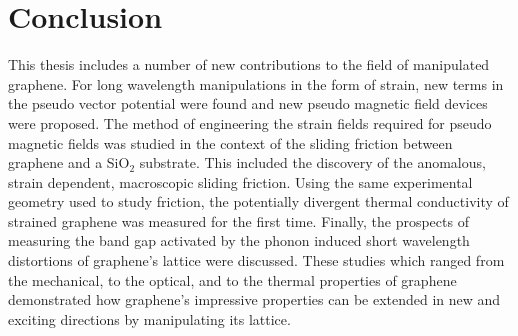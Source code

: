 \chapter{Conclusion}
This thesis includes a number of new contributions to the field of manipulated grap\-hene.
For long wavelength manipulations in the form of strain, new terms in the pseudo vector potential were found and new pseudo magnetic field devices were proposed.
The method of engineering the strain fields required for pseudo magnetic fields was studied in the context of the sliding friction between graphene and a SiO$_2$ substrate.
This included the discovery of the anomalous, strain dependent, macroscopic sliding friction.
Using the same experimental geometry used to study friction, the potentially divergent thermal conductivity of strained graphene was measured for the first time.
Finally, the prospects of measuring the band gap activated by the phonon induced short wavelength distortions of graphene's lattice were discussed.
These studies which ranged from the mechanical, to the optical, and to the thermal properties of graphene demonstrated how graphene's impressive properties can be extended in new and exciting directions by manipulating its lattice.